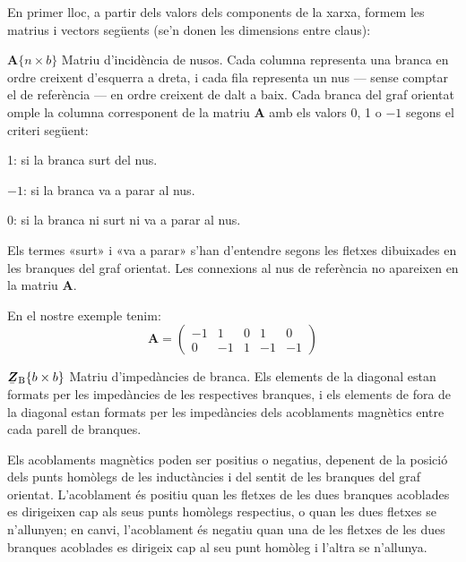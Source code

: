 En primer lloc, a partir dels valors dels components de la xarxa, formem les matrius i vectors següents (se'n donen les  dimensions entre claus):
\begin{list}{}
{\setlength{\labelwidth}{20mm} \setlength{\leftmargin}{22mm} \setlength{\labelsep}{2mm}}
   \item[$\boldsymbol{A}\{n\times b\}$] Matriu d'incidència de nusos. Cada columna representa una branca en ordre creixent d'esquerra a dreta, i cada fila representa un nus --- sense comptar el de referència --- en ordre creixent de dalt a baix. Cada branca del graf orientat omple la columna corresponent de la matriu $\boldsymbol{A}$ amb els valors 0, 1 o $-1$ segons el criteri següent:
   \begin{list}{}
   {\setlength{\labelwidth}{7mm} \setlength{\leftmargin}{9mm} \setlength{\labelsep}{2mm}}
      \item[1:]  si la branca surt del nus.
      \item[$-1$:] si la branca va a parar al nus.
      \item[0:]  si la branca ni surt ni va a parar al nus.
   \end{list}
   Els termes «surt» i «va a parar» s'han d'entendre segons les fletxes dibuixades en les branques del graf orientat. Les connexions al nus de referència no apareixen en la matriu $\boldsymbol{A}$.

   En el nostre exemple tenim:
   \[
      \boldsymbol{A} = \left(\begin{array}{rrrrr} -1 & 1  & 0 &  1 & 0 \\  0 & -1 & 1 & -1 & -1
                   \end{array} \right)
   \]

   \item[$\mcmplx{Z}\ped{B}\{b\times b\}$] Matriu d'impedàncies de branca. Els elements de la diagonal estan formats per les impedàncies de les respectives branques, i els elements de fora de la diagonal estan formats per les impedàncies dels acoblaments magnètics entre cada parell de branques.

   Els acoblaments magnètics poden ser positius o negatius, depenent
    de la posició dels punts homòlegs de les inductàncies i del sentit
    de les branques del graf orientat. L'acoblament és positiu quan les
    fletxes de les dues branques acoblades es dirigeixen cap als seus punts
    homòlegs respectius, o quan les dues fletxes se n'allunyen; en canvi,
    l'acoblament és negatiu quan una de les fletxes de les dues branques
    acoblades es dirigeix cap al seu punt homòleg i l'altra se n'allunya.


\end{list}
